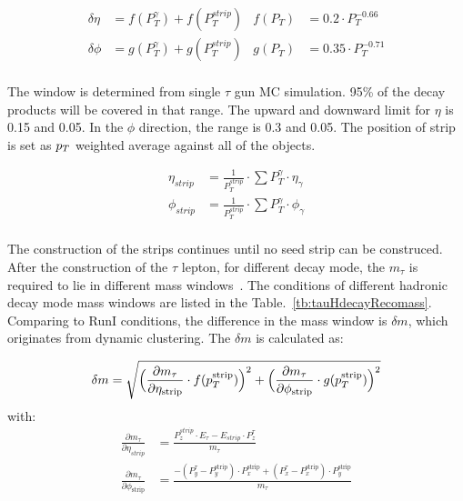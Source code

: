 \begin{align*}
\delta\eta&=f(P_{T}^{\gamma})+f(P_{T}^{strip})   & f(P_{T})&=0.2\cdot P_{T}^{-0.66}\\
\delta\phi&=g(P_{T}^{\gamma})+g(P_{T}^{strip}) & g(P_{T})&=0.35\cdot P_{T}^{-0.71}\\
\end{align*}

The window is determined from single $\tau$ gun MC simulation. 95\% of the decay products will be covered in that range. The upward and downward limit for $\eta$ is 0.15 and 0.05. In the $\phi$ direction, the range is 0.3 and 0.05.  The position of strip is set as $p_{T}$ weighted average against all of the objects. 

\begin{align*}
\eta_{strip}&=\frac{1}{P_{T}^{strip}}\cdot\sum P_{T}^{\gamma}\cdot\eta_{\gamma}\\
\phi_{strip}&=\frac{1}{P_{T}^{strip}}\cdot\sum P_{T}^{\gamma}\cdot\phi_{\gamma}\\
\end{align*}

The construction of the strips continues until no seed strip can be construced. After the construction of the $\tau$ lepton, for different decay mode, the $m_{\tau}$ is required to lie in different mass windows~\cite{TauReconstuction}.  The conditions of different hadronic decay mode mass windows are listed in the Table.~\ref{tb:tauHdecayRecomass}. Comparing to RunI conditions, the difference in the mass window is $\delta m$, which originates from dynamic clustering. The $\delta m$ is calculated as:

\begin{align*}
\delta m&=\sqrt{\Big(\frac{\partial m_{\tau}}{\partial \eta_\text{{strip}}}\cdot f(p_{T}^\text{{strip}})\Big)^{2}+\Big(\frac{\partial m_{\tau}}{\partial \phi_\text{{strip}}}\cdot g(p_{T}^\text{{strip}})\Big)^{2}}\\
\end{align*}
with:
\begin{align*}
\frac{\partial m_{\tau}}{\partial\eta_{strip}}&=\frac{P_{z}^{strip}\cdot E_{\tau}-E_{strip}\cdot P_{z}^{\tau}}{m_{\tau}}\\
\frac{\partial m_{\tau}}{\partial\phi_\text{{strip}}}&=\frac{-(P_{y}^{\tau}-P_{y}^\text{{strip}})\cdot P_{x}^\text{{strip}}+(P_{x}^{\tau}-P_{x}^\text{{strip}})\cdot P_{y}^\text{{strip}}}{m_{\tau}}
\end{align*}


